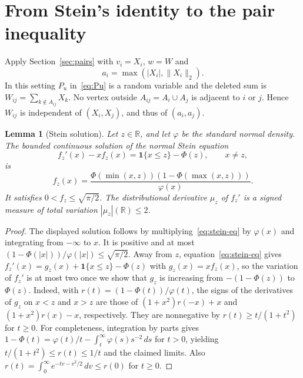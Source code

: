\documentclass[11pt,a4paper]{article}
\newtheorem{lemma}[theorem]{Lemma}
\newcommand{\R}{\mathbb R}
\newcommand{\ind}{\mathbf 1}
\begin{document}
\section{From Stein's identity to the pair inequality}\label{sec:stein}
Apply Section~\ref{sec:pairs} with $v_i=X_i$, $w=W$ and
\begin{equation}\label{eq:envelopes}
 a_i=\max(|X_i|,\|X_i\|_2).
\end{equation}
In this setting $P_u$ in~\eqref{eq:Pu} is a random variable and the
deleted sum is $W_{ij}=\sum_{k\notin A_{ij}}X_k$. No vertex outside
$A_{ij}=A_i\cup A_j$ is adjacent to $i$ or $j$. Hence $W_{ij}$ is
independent of $(X_i,X_j)$, and thus of $(a_i,a_j)$.

\begin{lemma}[Stein solution]\label{lem:stein-sol}
Let $z\in\R$, and let $\varphi$ be the standard normal density.
The bounded continuous solution of the normal Stein equation
\begin{equation}\label{eq:stein-eq}
 f_z'(x)-xf_z(x)=\ind\{x\le z\}-\Phi(z),\qquad x\ne z,
\end{equation}
is
\[
 f_z(x)=\frac{\Phi(\min(x,z))(1-\Phi(\max(x,z)))}{\varphi(x)}.
\]
It satisfies $0<f_z\le\sqrt{\pi/2}$. The distributional derivative
$\mu_z$ of $f_z'$ is a signed measure of total variation
$|\mu_z|(\R)\le2$.
\end{lemma}
\begin{proof}
The displayed solution follows by multiplying~\eqref{eq:stein-eq} by
$\varphi(x)$ and integrating from $-\infty$ to $x$. It is positive and at most $(1-\Phi(|x|))/\varphi(|x|)\le\sqrt{\pi/2}$.
Away from $z$, equation~\eqref{eq:stein-eq} gives $f_z'(x)=g_z(x)+\ind\{x\le z\}-\Phi(z)$
with $g_z(x)=xf_z(x)$, so the variation of $f_z'$ is at most two once we show that $g_z$ is increasing from $-(1-\Phi(z))$ to $\Phi(z)$. Indeed, with $r(t)=(1-\Phi(t))/\varphi(t)$, the signs of the derivatives of $g_z$ on $x<z$ and $x>z$ are those of $(1+x^2)r(-x)+x$ and $(1+x^2)r(x)-x$, respectively. They are nonnegative by $r(t)\ge t/(1+t^2)$ for $t\ge0$. For completeness, integration by parts gives
$1-\Phi(t)=\varphi(t)/t-\int_t^\infty\varphi(s)s^{-2}\,ds$ for $t>0$, yielding $t/(1+t^2)\le r(t)\le1/t$ and the claimed limits. Also $r(t)=\int_0^\infty e^{-tv-v^2/2}\,dv\le r(0)$ for $t\ge0$.
\end{proof}
\end{document}
